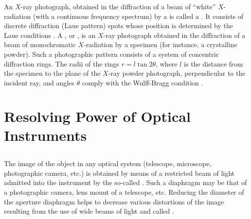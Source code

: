 An $X$-ray photograph, obtained in the diffraction of a beam of ``white'' $X$-radiation (with a continuous frequency spectrum) by a  is called a . It consists of discrete diffraction (Laue pattern) spots whose position is determined by the Laue conditions . A , or , is an $X$-ray photograph obtained in the diffraction of a beam of monochromatic $X$-radiation by a  specimen (for instance, a crystalline powder).
Such a photographic pattern consists of a system of concentric
diffraction rings. The radii of the rings $r = l \tan 2\theta$, where $l$ is the distance from the specimen to the plane of the $X$-ray powder photograph, perpendicular to the incident ray, and angles $\theta$ comply with the Wulff-Bragg condition .

\section{Resolving Power of Optical Instruments}
\label{sec-33.5} 

\subsection{}\label{33.5.1} The image of the object in any optical system (telescope, microscope, photographic camera, etc.) is obtained by means of a restricted beam of light admitted into the instrument by the so-called . Such a diaphragm may be that of a photographic camera, lens mount of a telescope, etc. Reducing the diameter of the aperture diaphragm helps to decrease various distortions of the image resulting from the use of wide beams
of light and called .

